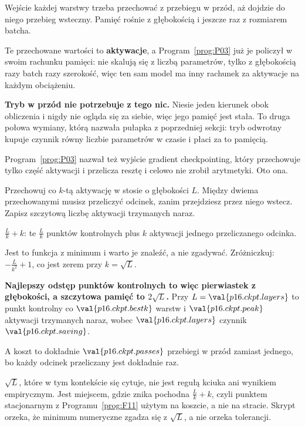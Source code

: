 \begin{fr}
\begin{ansblock}
Wejście każdej warstwy trzeba przechować z przebiegu w przód, aż dojdzie do
niego przebieg wsteczny. Pamięć rośnie z głębokością i jeszcze raz z rozmiarem
batcha.
\end{ansblock}

Te przechowane wartości to \textbf{aktywacje}, a Program~\ref{prog:P03} już je
policzył w swoim rachunku pamięci: nie skalują się z liczbą parametrów, tylko z
głębokością razy batch razy szerokość, więc ten sam model ma inny rachunek za
aktywacje na każdym obciążeniu.

\textbf{Tryb w przód nie potrzebuje z tego nic.} Niesie jeden kierunek obok
obliczenia i nigdy nie ogląda się za siebie, więc jego pamięć jest stała. To
druga połowa wymiany, którą nazwała pułapka z poprzedniej sekcji: tryb
odwrotny kupuje czynnik równy liczbie parametrów w czasie i płaci za to
pamięcią.

\end{fr}

\begin{fr}
Program~\ref{prog:P03} nazwał też wyjście \dash{} gradient checkpointing, który
przechowuje tylko część aktywacji i przelicza resztę \dash{} i celowo nie zrobił
arytmetyki. Oto ona.

Przechowuj co $k$-tą aktywację w stosie o głębokości $L$. Między dwiema
przechowanymi musisz przeliczyć odcinek, zanim przejdziesz przez niego wstecz.
Zapisz szczytową liczbę aktywacji trzymanych naraz.
\dotline
\nextframe
\end{fr}

\begin{fr}
\begin{ansblock}
$\frac{L}{k} + k$: te $\frac{L}{k}$ punktów kontrolnych plus $k$ aktywacji
jednego przeliczanego odcinka.
\end{ansblock}

Jest to funkcja z minimum i warto je znaleźć, a nie zgadywać. Zróżniczkuj:
$-\frac{L}{k^{2}} + 1$, co jest zerem przy $k = \sqrt{L}$.

\textbf{Najlepszy odstęp punktów kontrolnych to więc pierwiastek z głębokości,
a szczytowa pamięć to $2\sqrt{L}$.} Przy $L = \val{p16.ckpt.layers}$ to punkt
kontrolny co $\val{p16.ckpt.bestk}$ warstw i $\val{p16.ckpt.peak}$ aktywacji
trzymanych naraz, wobec $\val{p16.ckpt.layers}$ \dash{} czynnik
$\val{p16.ckpt.saving}$.

A koszt to dokładnie $\val{p16.ckpt.passes}$ przebiegi w przód zamiast jednego,
bo każdy odcinek przeliczany jest dokładnie raz.

\begin{note}
$\sqrt{L}$, które w tym kontekście się cytuje, nie jest regułą kciuka ani
wynikiem empirycznym. Jest miejscem, gdzie znika pochodna $\frac{L}{k} + k$,
czyli punktem stacjonarnym z Programu~\ref{prog:F11} użytym na koszcie, a nie
na stracie. Skrypt orzeka, że minimum numeryczne zgadza się z $\sqrt{L}$, a nie
orzeka tolerancji.
\end{note}
\end{fr}

